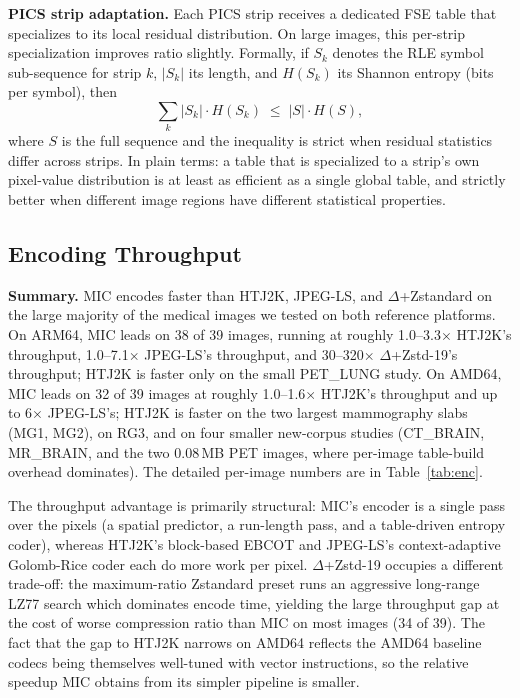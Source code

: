 \documentclass[journal]{IEEEtran}
\begin{document}
\textbf{PICS strip adaptation.} Each PICS strip receives a dedicated FSE table
that specializes to its local residual distribution. On large images, this
per-strip specialization improves ratio slightly. Formally, if $S_k$ denotes
the RLE symbol sub-sequence for strip $k$, $|S_k|$ its length, and $H(S_k)$
its Shannon entropy (bits per symbol), then
\begin{equation}
  \sum_k |S_k| \cdot H(S_k) \;\leq\; |S| \cdot H(S),
\end{equation}
where $S$ is the full sequence and the inequality is strict when residual
statistics differ across strips. In plain terms: a table that is specialized
to a strip's own pixel-value distribution is at least as efficient as a single
global table, and strictly better when different image regions have different
statistical properties.

\subsection{Encoding Throughput}

\textbf{Summary.} MIC encodes faster than HTJ2K, JPEG-LS, and
$\Delta$+Zstandard on the large majority of the medical images we
tested on both reference platforms. On ARM64, MIC leads on 38 of 39
images, running at roughly 1.0--3.3$\times$ HTJ2K's throughput,
1.0--7.1$\times$ JPEG-LS's throughput, and 30--320$\times$
$\Delta$+Zstd-19's throughput; HTJ2K is faster only on the small
PET\_LUNG study. On AMD64, MIC leads on 32 of 39 images at roughly
1.0--1.6$\times$ HTJ2K's throughput and up to 6$\times$ JPEG-LS's; HTJ2K
is faster on the two largest mammography slabs (MG1, MG2), on RG3, and on
four smaller new-corpus studies (CT\_BRAIN, MR\_BRAIN, and the two
0.08\,MB PET images, where per-image table-build overhead dominates). The detailed
per-image numbers are in Table~\ref{tab:enc}.

The throughput advantage is primarily structural: MIC's encoder is a
single pass over the pixels (a spatial predictor, a run-length pass, and
a table-driven entropy coder), whereas HTJ2K's block-based EBCOT and
JPEG-LS's context-adaptive Golomb-Rice coder each do more work per pixel.
$\Delta$+Zstd-19 occupies a different trade-off: the
maximum-ratio Zstandard preset runs an aggressive long-range LZ77 search
which dominates encode time, yielding the large throughput gap
at the cost of worse compression ratio than MIC on most images (34 of
39). The fact that the gap to HTJ2K narrows on AMD64 reflects the
AMD64 baseline codecs being themselves well-tuned with vector
instructions, so the relative speedup MIC obtains from its simpler
pipeline is smaller.
\end{document}
